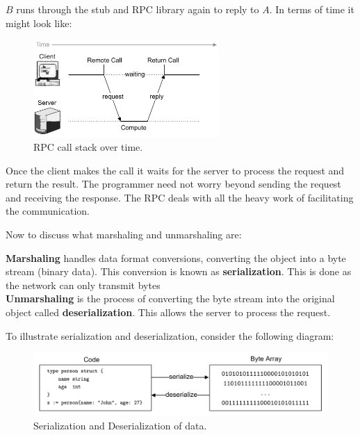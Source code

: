 \noindent
$B$ runs through the stub and RPC library again to reply to $A$. In terms of time it might look like:

\begin{figure}[h]
    \centering
    \includegraphics[width=0.63\textwidth]{Sections/rpc/call_time.png}
    \caption{RPC call stack over time.}
    \label{fig:rpc_time}
\end{figure}

\noindent 
Once the client makes the call it waits for the server to process the request and return the result. The programmer need not worry beyond sending the request and receiving the response.
The RPC deals with all the heavy work of facilitating the communication.

\newpage 

\noindent
Now to discuss what marshaling and unmarshaling are:
\begin{Def}

    \textbf{Marshaling} handles data format conversions, converting the object into a byte stream (binary data).
    This conversion is known as \textbf{serialization}. This is done as the network can only transmit bytes\\
    
    \noindent
    \textbf{Unmarshaling} is the process of converting the byte stream into the original object called \textbf{deserialization}. 
    This allows the server to process the request.
\end{Def}

\noindent
To illustrate serialization and deserialization, consider the following diagram:
\begin{figure}[h]
    \centering
    \includegraphics[width=1\textwidth]{Sections/rpc/ser.png}
    \caption{Serialization and Deserialization of data.}
    \label{fig:ser_deser}
\end{figure}

